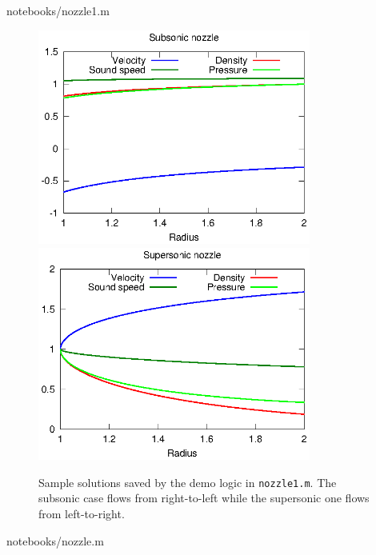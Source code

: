 \documentclass[letterpaper,11pt,nointlimits,reqno]{amsart}
\begin{document}

                {notebooks/nozzle1.m}

\begin{figure}[p]
  \centering
  \includegraphics[width=0.80\textwidth]{nozzle_subsonic}
  \vfill
  \includegraphics[width=0.80\textwidth]{nozzle_supersonic}
  \caption{
      \label{fig:sample_solns}
      Sample solutions saved by the demo logic in \texttt{nozzle1.m}.  The
      subsonic case flows from right-to-left while the supersonic one flows
      from left-to-right.
  }
\end{figure}


                {notebooks/nozzle.m}
\end{document}
